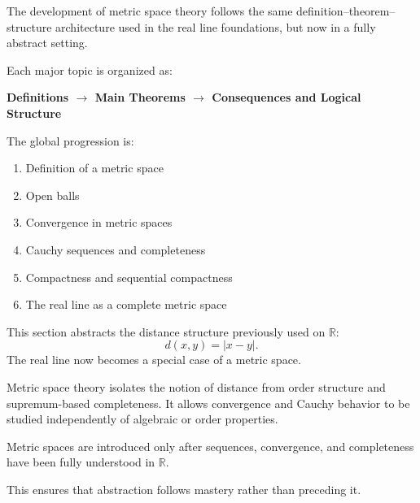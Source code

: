 The development of metric space theory follows the same
definition--theorem--structure architecture used in the real line
foundations, but now in a fully abstract setting.

Each major topic is organized as:
\begin{center}
\textbf{Definitions $\longrightarrow$ Main Theorems $\longrightarrow$ Consequences and Logical Structure}
\end{center}

The global progression is:

\begin{enumerate}
  \item Definition of a metric space
  \item Open balls
  \item Convergence in metric spaces
  \item Cauchy sequences and completeness
  \item Compactness and sequential compactness
  \item The real line as a complete metric space
\end{enumerate}

\vspace{1em}

\begin{remark}
This section abstracts the distance structure previously used on
$\mathbb{R}$:
\[
d(x,y) = |x-y|.
\]
The real line now becomes a special case of a metric space.
\end{remark}

\begin{remark}
Metric space theory isolates the notion of distance
from order structure and supremum-based completeness.
It allows convergence and Cauchy behavior to be studied
independently of algebraic or order properties.
\end{remark}






% 
% 
% 
% 


\begin{remark}
Metric spaces are introduced only after sequences,
convergence, and completeness have been fully understood
in $\mathbb{R}$.

This ensures that abstraction follows mastery rather than
preceding it.
\end{remark}
